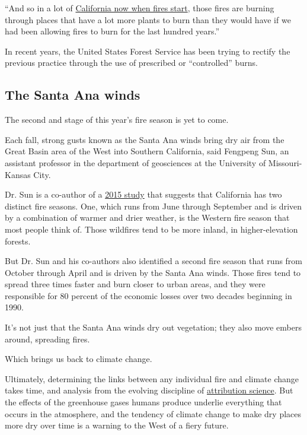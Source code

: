 ``And so in a lot of
\href{https://www.nytimes3xbfgragh.onion/interactive/2019/03/18/business/pge-california-wildfires.html}{California
now when fires start}, those fires are burning through places that have
a lot more plants to burn than they would have if we had been allowing
fires to burn for the last hundred years.''

In recent years, the United States Forest Service has been trying to
rectify the previous practice through the use of prescribed or
``controlled'' burns.

\hypertarget{the-santa-ana-winds}{%
\subsection{The Santa Ana winds}\label{the-santa-ana-winds}}

The second and stage of this year's fire season is yet to come.

Each fall, strong gusts known as the Santa Ana winds bring dry air from
the Great Basin area of the West into Southern California, said Fengpeng
Sun, an assistant professor in the department of geosciences at the
University of Missouri-Kansas City.

Dr. Sun is a co-author of a
\href{http://iopscience.iop.org/article/10.1088/1748-9326/10/9/094005}{2015
study} that suggests that California has two distinct fire seasons. One,
which runs from June through September and is driven by a combination of
warmer and drier weather, is the Western fire season that most people
think of. Those wildfires tend to be more inland, in higher-elevation
forests.

But Dr. Sun and his co-authors also identified a second fire season that
runs from October through April and is driven by the Santa Ana winds.
Those fires tend to spread three times faster and burn closer to urban
areas, and they were responsible for 80 percent of the economic losses
over two decades beginning in 1990.

It's not just that the Santa Ana winds dry out vegetation; they also
move embers around, spreading fires.

Which brings us back to climate change.

Ultimately, determining the links between any individual fire and
climate change takes time, and analysis from the evolving discipline of
\href{https://www.nytimes3xbfgragh.onion/2016/08/02/science/looking-quickly-for-the-fingerprints-of-climate-change.html}{attribution
science}. But the effects of the greenhouse gases humans produce
underlie everything that occurs in the atmosphere, and the tendency of
climate change to make dry places more dry over time is a warning to the
West of a fiery future.

